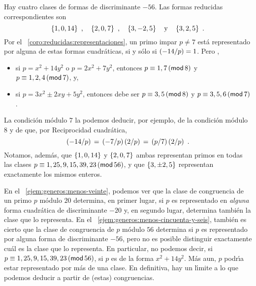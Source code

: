 \begin{ejemGeneros}\label{ejem:generos:menos-cincuenta-y-seis}
	Hay cuatro clases de formas de discriminante $-56$. Las formas
	reducidas correspondientes son
	\begin{displaymath}
		\binaria{1,0,14} \dispcomma\quad
		\binaria{2,0,7} \dispcomma\quad
		\binaria{3,-2,5} \dispand
		\binaria{3,2,5}
		\dispstop
	\end{displaymath}
	Por el \coroname~\ref{coro:reducidas:representaciones},
	un primo impar $p\neq 7$ est\'a representado por alguna de estas
	formas cuadr\'aticas, si y s\'olo si $\tlegendre{-14} p=1$. Pero
	\quedacomoejercicio,
	\begin{itemize}
		\item si $p=x^2+14y^2$ o $p=2x^2+7y^2$, entonces
			$p\equiv 1,7\tmodulo[8]$ y
			$p\equiv 1,2,4\tmodulo[7]$, y,
		\item si $p=3x^2\pm 2xy+5y^2$, entonces debe ser
			$p\equiv 3,5\tmodulo[8]$ y
			$p\equiv 3,5,6\tmodulo[7]$.
	\end{itemize}
	La condici\'on m\'odulo $7$ la podemos deducir, por ejemplo, de la
	condici\'on m\'odulo $8$ y de que, por Reciprocidad cuadr\'atica,
	\begin{displaymath}
		\tlegendre{-14} p\,=\,\tlegendre{-7} p\tlegendre 2 p\,=\,
			\tlegendre p 7\tlegendre 2 p
		\dispstop
	\end{displaymath}
	Notamos, adem\'as, que $\binaria{1,0,14}$ y $\binaria{2,0,7}$ ambas
	representan primos en todas las clases
	$p\equiv 1,25,9,15,39,23\tmodulo[56]$,
	y que $\binaria{3,\pm 2,5}$ representan exactamente los mismos
	enteros.
\end{ejemGeneros}

\begin{obsGeneros}\label{obs:generos:ejemplos}
	En el \ejemname~\ref{ejem:generos:menos-veinte},
	podemos ver que la clase de congruencia de un primo $p$ m\'odulo $20$
	determina, en primer lugar, si $p$ es representado en \emph{alguna}
	forma cuadr\'atica de discriminante $-20$ y, en segundo lugar,
	determina tambi\'en la clase que lo representa.
	En el \ejemname~\ref{ejem:generos:menos-cincuenta-y-seis}, tambi\'en
	es cierto que la clase de congruencia de $p$ m\'odulo $56$
	determina si $p$ es representado por alguna forma de discriminante
	$-56$, pero no es posible distinguir exactamente cu\'al es la clase
	que lo representa. En particular, no podemos decir, si
	$p\equiv 1,25,9,15,39,23\tmodulo[56]$, si $p$ es de la forma
	$x^2+14y^2$. M\'as aun, $p$ podr\'{\i}a estar %
	representado por m\'as de una clase.
	En definitiva, hay un l\'{\i}mite a lo que podemos deducir a partir
	de (estas) congruencias.
\end{obsGeneros}


